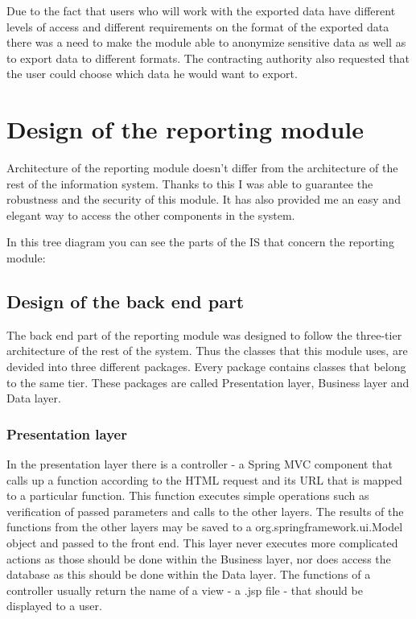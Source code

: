 \documentclass[thesis=B,english]{FITthesis}[2012/10/20]
\begin{document}
Due to the fact that users who will work with the exported data have different levels of access and different requirements on the format of the exported data there was a need to make the module able to anonymize sensitive data as well as to export data to different formats. The contracting authority also requested that the user could choose which data he would want to export.

\section{Design of the reporting module}
Architecture of the reporting module doesn't differ from the architecture of the rest of the information system. Thanks to this I was able to guarantee the robustness and the security of this module. It has also provided me an easy and elegant way to access the other components in the system.

In this tree diagram you can see the parts of the IS that concern the reporting module:



\subsection{Design of the back end part}
The back end part of the reporting module was designed to follow the three-tier architecture of the rest of the system. Thus the classes that this module uses, are devided into three different packages. Every package contains classes that belong to the same tier. These packages are called Presentation layer, Business layer and Data layer. 

\subsubsection{Presentation layer}
In the presentation layer there is a controller - a Spring MVC component that calls up a function according to the HTML request and its URL that is mapped to a particular function. This function executes simple operations such as verification of passed parameters and calls to the other layers. The results of the functions from the other layers may be saved to a org.springframework.ui.Model object and passed to the front end. This layer never executes more complicated actions as those should be done within the Business layer, nor does access the database as this should be done within the Data layer. The functions of a controller usually return the name of a view - a .jsp file - that should be displayed to a user.
\end{document}
